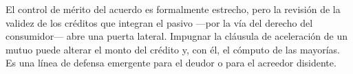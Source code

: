 \begin{foco}
El control de mérito del acuerdo es formalmente estrecho, pero la revisión de la validez de los
créditos que integran el pasivo ---por la vía del derecho del consumidor--- abre una puerta
lateral. Impugnar la cláusula de aceleración de un mutuo puede alterar el monto del crédito y,
con él, el cómputo de las mayorías. Es una línea de defensa emergente para el deudor o para el
acreedor disidente.
\end{foco}
